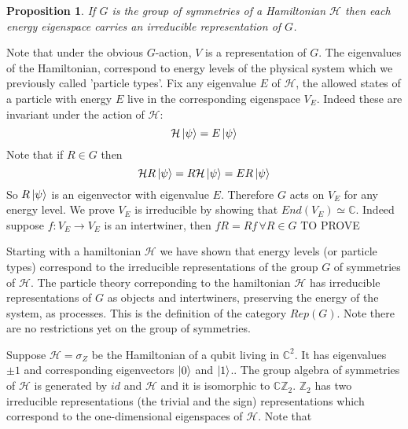 \documentclass{article}
\newtheorem{proposition}[theorem]{Proposition}
\newenvironment{proof}[1][Proof]{\begin{trivlist}
\item[\hskip \labelsep {\bfseries #1}]}{\end{trivlist}}
\newenvironment{example}[1][Example]{\begin{trivlist}
\item[\hskip \labelsep {\bfseries #1}]}{\end{trivlist}}
\newcommand{\ham}{\mathcal{H}}
\begin{document}
\begin{proposition}
If $G$ is the group of symmetries of a Hamiltonian $\mathcal{H}$ then each energy eigenspace carries an irreducible representation of $G$.
\end{proposition}
\begin{proof}
Note that under the obvious $G$-action, $V$ is a representation of $G$. 
The eigenvalues of the Hamiltonian, correspond to energy levels of the physical system which we previously called 'particle types'. Fix any eigenvalue $E$ of $\ham$, the allowed states of a particle with energy $E$ live in the corresponding eigenspace $V_E$. Indeed these are invariant under the action of $\ham$:
$$ \ham \ket{\psi}= E\ket{\psi}$$
Note that if $R\in G$ then
$$ \ham R \ket{\psi}=R\ham \ket{\psi}=ER\ket{\psi}$$
So $R\ket{\psi}$ is an eigenvector with eigenvalue $E$. Therefore $G$ acts on $V_E$ for any energy level.
We prove $V_E$ is irreducible by showing that $End(V_E) \simeq \mathbb{C}$. Indeed suppose $f:V_E \rightarrow V_E$ is an intertwiner, then $fR=Rf \, \forall R \in G$
TO PROVE
\end{proof}
Starting with a hamiltonian $\ham$ we have shown that energy levels (or particle types) correspond to the irreducible representations of the group $G$ of symmetries of $\ham$. The particle theory correponding to the hamiltonian $\ham$ has irreducible representations of $G$ as objects and intertwiners, preserving the energy of the system, as processes. This is the definition of the category $Rep(G)$. Note there are no restrictions yet on the group of symmetries.
\begin{example}
Suppose $\ham = \sigma_Z$ be the Hamiltonian of a qubit living in $\mathbb{C}^2$. It has eigenvalues $\pm1$ and corresponding eigenvectors $\ket{0}$ and $\ket{1}$.. The group algebra of symmetries of $\ham$ is generated by $id$ and $\ham$ and it is isomorphic to $\mathbb{C}\mathbb{Z}_2$. $\mathbb{Z}_2$ has two irreducible representations (the trivial and the sign) representations which correspond to the one-dimensional eigenspaces of $\ham$. Note that 
\end{example}
\end{document}
